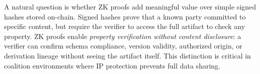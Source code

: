 A natural question is whether ZK proofs add meaningful value over simple signed hashes stored on-chain.
Signed hashes prove that a known party committed to specific content, but require the verifier to access the full artifact to check any property.
ZK proofs enable \emph{property verification without content disclosure}: a verifier can confirm schema compliance, version validity, authorized origin, or derivation lineage without seeing the artifact itself.
This distinction is critical in coalition environments where IP protection prevents full data sharing.
